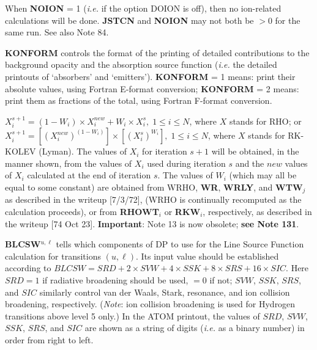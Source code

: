 \space \noindent
When {\bf NOION} = 1 ({\it i.e.} if the option DOION is off), 
then no ion-related calculations will be done.
{\bf JSTCN} and {\bf NOION} may not both be $> 0$ for the same run.
See also Note 84.
\blankline
\blankline
\centerline{}
\space \noindent
{\bf KONFORM} controls the format of the printing of detailed contributions
to the background opacity and the absorption source function ({\it i.e.}
the detailed printouts of `absorbers' and `emitters'). \np
{\bf KONFORM} = 1
means: print their absolute values, using Fortran E-format conversion; \np
{\bf KONFORM} = 2 means: print them as fractions of the total, using
Fortran \break F-format conversion.
\blankline
\blankline
\centerline{}
\space \noindent
$X^{s+1}_i = {(1 - W_i)} \times X^{new}_i + W_i \times X^s_i, \; 
1 \leq i \leq N$, where $X$ stands for RHO; or \np
$X^{s+1}_i = [ (X^{new}_i)^{(1 - W_i)} ] \times [ (X^s_i)^{W_i} ], \; 1 \leq i 
\leq N$, where $X$ stands for RK-KOLEV (Lyman). \np
The values of $X_i$ for iteration $s+1$ will be obtained, in the manner
shown, from the values of $X_i$ used during iteration $s$ and the $new$
values of $X_i$ calculated at the end of iteration $s$. The values
of $W_i$ (which may all be equal to some constant) are obtained from
WRHO, {\bf WR}, {\bf WRLY}, and {\bf WTW}$_j$ as described in the
writeup [7/3/72], (WRHO is continually recomputed as the calculation proceeds),
or from {\bf RHOWT}$_i$ or {\bf RKW}$_i$, respectively, as described in the
writeup [74 Oct 23]. \np
{\bf Important}: Note 13 is now obsolete; {\bf see Note 131}.
\blankline
\blankline
\centerline{}
\space \noindent
{\bf BLCSW}$^{u,\ell}$ tells which components of DP to use for the Line
Source Function calculation for transitions $(u, \ell)$.
Its input value should be established
according to $BLCSW = SRD + 2 \times SVW + 4 \times SSK 
+ 8 \times SRS + 16 \times SIC$. \np
Here $SRD = 1$ if radiative broadening should be used, $= 0$ if not;
$SVW$, $SSK$, $SRS$, and $SIC$ similarly control van der Waals, Stark,
resonance, and ion collision broadening, respectively. ({\it Note}: ion
collision broadening is used for Hydrogen transitions above level 5 only.)
In the ATOM printout, the values of $SRD$, $SVW$, $SSK$, $SRS$, and 
$SIC$ are shown as a string of digits ({\it i.e.} as a
binary number) in order from right to left.
\ej
\centerline{}
\space \noindent

